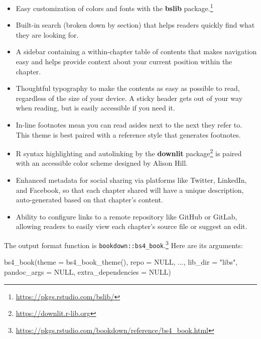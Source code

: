 \documentclass[
  12pt,
]{krantz}
\newenvironment{Shaded}{\begin{snugshade}}{\end{snugshade}}
\newcommand{\AttributeTok}[1]{\textcolor[rgb]{0.77,0.63,0.00}{#1}}
\newcommand{\ConstantTok}[1]{\textcolor[rgb]{0.00,0.00,0.00}{#1}}
\newcommand{\FunctionTok}[1]{\textcolor[rgb]{0.00,0.00,0.00}{#1}}
\newcommand{\NormalTok}[1]{#1}
\newcommand{\StringTok}[1]{\textcolor[rgb]{0.31,0.60,0.02}{#1}}
\renewcommand{\href}[2]{#2\footnote{\url{#1}}}
\theoremstyle{definition}
\theoremstyle{definition}
\theoremstyle{definition}
\theoremstyle{definition}
\theoremstyle{remark}
\begin{document}
\begin{itemize}
\item
  Easy customization of colors and fonts with
  \href{https://pkgs.rstudio.com/bslib/}{the \textbf{bslib} package.}
\item
  Built-in search (broken down by section) that helps readers quickly find what
  they are looking for.
\item
  A sidebar containing a within-chapter table of contents that makes
  navigation easy and helps provide context about your current position
  within the chapter.
\item
  Thoughtful typography to make the contents as easy as possible to read,
  regardless of the size of your device. A sticky header gets out of your
  way when reading, but is easily accessible if you need it.
\item
  In-line footnotes mean you can read asides next to the next they refer
  to. This theme is best paired with a reference style that generates
  footnotes.
\item
  R syntax highlighting and autolinking by
  \href{https://downlit.r-lib.org}{the \textbf{downlit} package} is paired with an accessible
  color scheme designed by Alison Hill.
\item
  Enhanced metadata for social sharing via platforms like Twitter, LinkedIn, and Facebook, so that each chapter shared will have a unique description, auto-generated based on that chapter's content.
\item
  Ability to configure links to a remote repository like GitHub or GitLab, allowing readers to easily view each chapter's source file or suggest an edit.
\end{itemize}

The output format function is \href{https://pkgs.rstudio.com/bookdown/reference/bs4_book.html}{\texttt{bookdown::bs4\_book}.} Here are its arguments:

\begin{Shaded}
\begin{Highlighting}[]
\FunctionTok{bs4\_book}\NormalTok{(}\AttributeTok{theme =} \FunctionTok{bs4\_book\_theme}\NormalTok{(), }\AttributeTok{repo =} \ConstantTok{NULL}\NormalTok{, ...,}
  \AttributeTok{lib\_dir =} \StringTok{"libs"}\NormalTok{, }\AttributeTok{pandoc\_args =} \ConstantTok{NULL}\NormalTok{,}
  \AttributeTok{extra\_dependencies =} \ConstantTok{NULL}\NormalTok{)}
\end{Highlighting}
\end{Shaded}
\end{document}
